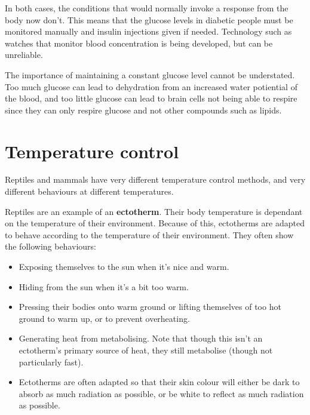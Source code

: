 \documentclass{article}
\begin{document}
In both cases, the conditions that would normally invoke a response from the
body now don't. This means that the glucose levels in diabetic people must be
monitored manually and insulin injections given if needed. Technology such as
watches that monitor blood concentration is being developed, but can be
unreliable.

The importance of maintaining a constant glucose level cannot be understated.
Too much glucose can lead to dehydration from an increased water potiential of
the blood, and too little glucose can lead to brain cells not being able to
respire since they can only respire glucose and not other compounds such as
lipids.

\section*{Temperature control}

Reptiles and mammals have very different temperature control methods, and very
different behaviours at different temperatures.

Reptiles are an example of an {\bf ectotherm}. Their body temperature is
dependant on the temperature of their environment. Because of this, ectotherms
are adapted to behave according to the temperature of their environment. They
often show the following behaviours:

\begin{itemize}

	\item Exposing themselves to the sun when it's nice and warm.

	\item Hiding from the sun when it's a bit too warm.

	\item Pressing their bodies onto warm ground or lifting themselves of too
	hot ground to warm up, or to prevent overheating.

	\item Generating heat from metabolising. Note that though this isn't an
	ectotherm's primary source of heat, they still metabolise (though not
	particularly fast).

	\item Ectotherms are often adapted so that their skin colour will either be
	dark to absorb as much radiation as possible, or be white to reflect as
	much radiation as possible.

\end{itemize}
\end{document}
